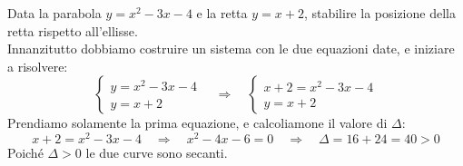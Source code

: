 \begin{esempio} Data la parabola \( y = x^2-3x-4\) e la retta \(y=x+2\), stabilire la posizione della retta 
rispetto all'ellisse.
\\[7pt]
Innanzitutto dobbiamo costruire un sistema con le due equazioni date, e iniziare a risolvere:
\[\begin{cases} y =x^2-3x-4 \\ y=x+2\end{cases} \quad \Rightarrow \quad \begin{cases} x+2 =x^2-3x-4 \\ y=x+2\end{cases}\]
Prendiamo solamente la prima equazione, e calcoliamone il valore di \(\Delta\):
\[x+2 =x^2-3x-4 \quad \Rightarrow \quad x^2-4x-6=0 \quad \Rightarrow \quad \Delta = 16+24=40>0\]
Poiché \(\Delta>0\) le due curve sono secanti.
\end{esempio}


